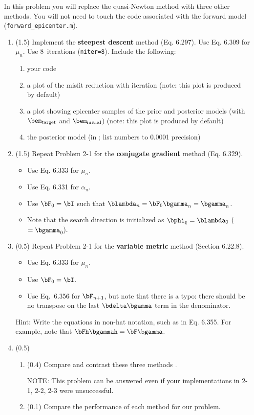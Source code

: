 \documentclass[11pt,titlepage,fleqn]{article}
\begin{document}
In this problem you will replace the quasi-Newton method with three other methods. You will not need to touch the code associated with the forward model (\verb+forward_epicenter.m+).

\begin{enumerate}
\item (1.5) Implement the {\bf steepest descent} method (Eq. 6.297). Use Eq. 6.309 for $\mu_n$. Use 8~iterations (\verb+niter=8+). Include the following:
%
\begin{enumerate}
\item your code
\item a plot of the misfit reduction with iteration (note: this plot is produced by default)
\item a plot showing epicenter samples of the prior and posterior models (with $\bem_{\rm target}$ and $\bem_{\rm initial}$) (note: this plot is produced by default)
\item the posterior model (in ; list numbers to 0.0001 precision)
\end{enumerate}

\label{steep}

\item (1.5) Repeat Problem 2-1 for the {\bf conjugate gradient} method (Eq. 6.329).
%
\begin{itemize}
\item Use Eq. 6.333 for $\mu_n$.
\item Use Eq. 6.331 for $\alpha_n$.
\item Use $\bF_0 = \bI$ such that $\blambda_n = \bF_0\bgamma_n = \bgamma_n$. 
\item Note that the search direction is initialized as $\bphi_0 = \blambda_0$ ($= \bgamma_0$).
\end{itemize}

\item (0.5) Repeat Problem 2-1 for the {\bf variable metric} method (Section 6.22.8).
%
\begin{itemize}
\item Use Eq. 6.333 for $\mu_n$.
\item Use $\bF_0 = \bI$.
\item Use Eq.~6.356 for $\bF_{n+1}$, but note that there is a typo: there should be no transpose on the last $\bdelta\bgamma$ term in the denominator.
\end{itemize}
%
Hint: Write the equations in non-hat notation, such as in Eq. 6.355. For example, note that $\bFh\bgammah = \bF\bgamma$.

\item (0.5)
%
\begin{enumerate}
\item (0.4) Compare and contrast these three methods \citep[see][]{Tarantola2005}.

NOTE: This problem can be answered even if your implementations in 2-1, 2-2, 2-3 were unsuccessful.

\item (0.1) Compare the performance of each method for our problem.
\end{enumerate}

\end{enumerate}
\end{document}
